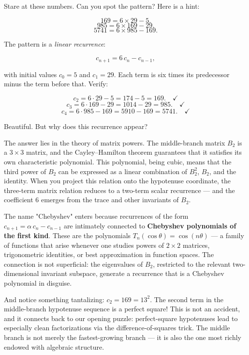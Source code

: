 \documentclass[11pt,twoside,openright]{book}
\theoremstyle{definition}
\theoremstyle{remark}
\begin{document}
Stare at these numbers. Can you spot the pattern? Here is a hint:

\[169 = 6 \times 29 - 5.\]
\[985 = 6 \times 169 - 29.\]
\[5741 = 6 \times 985 - 169.\]

The pattern is a \textit{linear recurrence}:

\[c_{n+1} = 6\, c_n - c_{n-1},\]

with initial values $c_0 = 5$ and $c_1 = 29$. Each term is six times its predecessor minus the term before that. Verify:

\[c_2 = 6 \cdot 29 - 5 = 174 - 5 = 169. \quad \checkmark\]
\[c_3 = 6 \cdot 169 - 29 = 1014 - 29 = 985. \quad \checkmark\]
\[c_4 = 6 \cdot 985 - 169 = 5910 - 169 = 5741. \quad \checkmark\]

Beautiful. But why does this recurrence appear?

The answer lies in the theory of matrix powers. The middle-branch matrix $B_2$ is a $3 \times 3$ matrix, and the Cayley--Hamilton theorem guarantees that it satisfies its own characteristic polynomial. This polynomial, being cubic, means that the third power of $B_2$ can be expressed as a linear combination of $B_2^2$, $B_2$, and the identity. When you project this relation onto the hypotenuse coordinate, the three-term matrix relation reduces to a two-term scalar recurrence --- and the coefficient $6$ emerges from the trace and other invariants of $B_2$.

The name "Chebyshev" enters because recurrences of the form $c_{n+1} = \alpha \, c_n - c_{n-1}$ are intimately connected to \textbf{Chebyshev polynomials of the first kind}. These are the polynomials $T_n(\cos\theta) = \cos(n\theta)$ --- a family of functions that arise whenever one studies powers of $2 \times 2$ matrices, trigonometric identities, or best approximation in function spaces. The connection is not superficial: the eigenvalues of $B_2$, restricted to the relevant two-dimensional invariant subspace, generate a recurrence that is a Chebyshev polynomial in disguise.

And notice something tantalizing: $c_2 = 169 = 13^2$. The second term in the middle-branch hypotenuse sequence is a perfect square! This is not an accident, and it connects back to our opening puzzle: perfect-square hypotenuses lead to especially clean factorizations via the difference-of-squares trick. The middle branch is not merely the fastest-growing branch --- it is also the one most richly endowed with algebraic structure.
\end{document}
